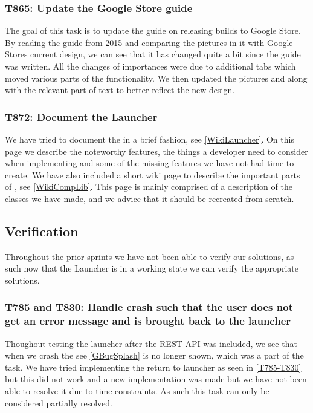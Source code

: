 \subsubsection{T865: Update the Google Store guide}
The goal of this task is to update the guide on releasing builds to Google
Store. By reading the guide from 2015 and comparing the pictures in it with
Google Stores current design, we can see that it has changed quite a bit since
the guide was written. All the changes of importances were due to additional
tabs which moved various parts of the functionality. We then updated the
pictures and along with the relevant part of text to better reflect the new
design.

\subsubsection{T872: Document the Launcher}
We have tried to document the  in a brief fashion, see
\autoref{WikiLauncher}. On this page we describe the noteworthy features, the
things a developer need to consider when implementing  and some of
the missing features we have not had time to create. We have also included a
short wiki page to describe the important parts of ,
see \autoref{WikiCompLib}. This page is mainly comprised of a description of the
classes we have made, and we advice that it should be recreated from scratch.

\subsection{Verification}
Throughout the prior sprints we have not been able to verify our solutions, as
such now that the Launcher is in a working state we can verify the appropriate
solutions.

\subsubsection{T785 and T830: Handle crash such that the user does not get an
error message and is brought back to the launcher}
Thoughout testing the launcher after the REST API was included, we see that when
we crash the  see \autoref{GBugSplash} is no
longer shown, which was a part of the task. We have tried implementing the
return to launcher as seen in \autoref{T785-T830} but this did not work and a new implementation was made but we have not been able to resolve it due
to time constraints.
As such this task can only be considered partially resolved.

